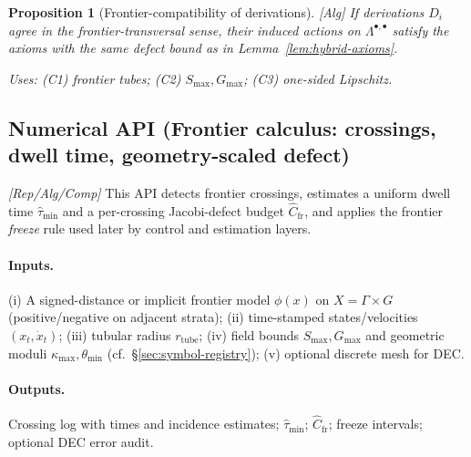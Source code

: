\documentclass[10pt]{article}
\newcommand{\uses}[1]{\par\smallskip\noindent\textit{Uses: }#1\par\smallskip}
\newcommand{\layertag}[1]{\textup{[#1]}}
\newtheorem{proposition}{Proposition}
\begin{document}
\begin{proposition}[Frontier-compatibility of derivations]\label{prop:graph-deriv}
\emph{[\textup{Alg}]} If derivations $D_i$ agree in the frontier-transversal sense, their induced actions on $\Lambda^{\bullet,\bullet}$ satisfy the axioms with the same defect bound as in Lemma~\ref{lem:hybrid-axioms}.
\uses{(C1) frontier tubes; (C2) $S_{\max},G_{\max}$; (C3) one-sided Lipschitz.}
\end{proposition}

\subsection*{Numerical API (Frontier calculus: crossings, dwell time, geometry-scaled defect)}
\emph{\layertag{Rep/Alg/Comp}} This API detects frontier crossings, estimates a uniform dwell time $\widehat{\tau}_{\min}$ and a per-crossing Jacobi-defect budget $\widehat{C}_{\mathrm{fr}}$, and applies the frontier \emph{freeze} rule used later by control and estimation layers.

\paragraph{Inputs.}
(i) A signed-distance or implicit frontier model $\phi(x)$ on $X=\Gamma\times G$ (positive/negative on adjacent strata);  
(ii) time-stamped states/velocities $(x_t,\dot{x}_t)$;  
(iii) tubular radius $r_{\mathrm{tube}}$; (iv) field bounds $S_{\max},G_{\max}$ and geometric moduli $\kappa_{\max},\theta_{\min}$ (cf.\ \S\ref{sec:symbol-registry});  
(v) optional discrete mesh for DEC.

\paragraph{Outputs.}
Crossing log with times and incidence estimates; $\widehat{\tau}_{\min}$; $\widehat{C}_{\mathrm{fr}}$; freeze intervals; optional DEC error audit.
\end{document}
